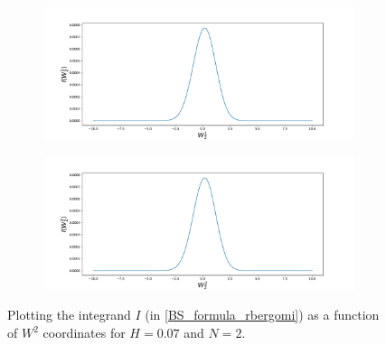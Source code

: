 \documentclass[11pt]{article}
\begin{document}
\begin{figure}[h!]
	\centering
	\begin{subfigure}{.4\textwidth}
		\centering
		\includegraphics[width=1\linewidth]{./figures/integrand_plotting_rBergomi/1D_plots/N_2/H_007/Bergomi_integrand_K_1_H_007_W21_N_2}
		\caption{}
		\label{fig:sub3}
	\end{subfigure}%
	\begin{subfigure}{.4\textwidth}
		\centering
		\includegraphics[width=1\linewidth]{./figures/integrand_plotting_rBergomi/1D_plots/N_2/H_007/Bergomi_integrand_K_1_H_007_W22_N_2}
		\caption{}
		\label{fig:sub4}
	\end{subfigure}
	\caption{Plotting the integrand $I$ (in \eqref{BS_formula_rbergomi}) as a function of $W^2$ coordinates for $H=0.07$ and $N=2$.}
	\label{fig:Integrand_H_007_N_2_W_2}
\end{figure}
\end{document}
